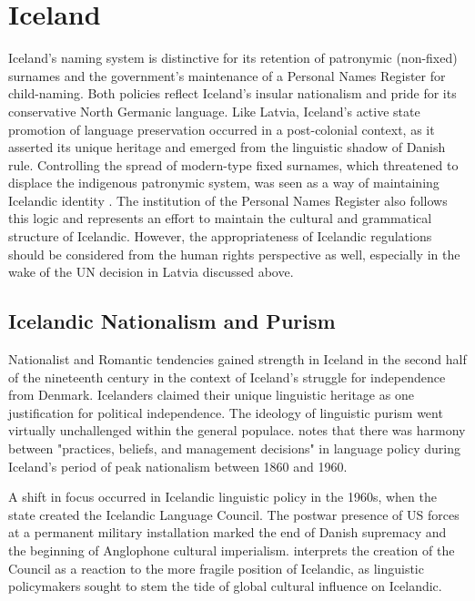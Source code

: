 \section{Iceland}

Iceland's naming system is distinctive for its retention of patronymic (non-fixed) surnames and the government's maintenance of a Personal Names Register for child-naming. Both policies reflect Iceland's insular nationalism and pride for its conservative North Germanic language. Like Latvia, Iceland's active state promotion of language preservation occurred in a post-colonial context, as it asserted its unique heritage and emerged from the linguistic shadow of Danish rule. Controlling the spread of modern-type fixed surnames, which threatened to displace the indigenous patronymic system, was seen as a way of maintaining Icelandic identity \parencite{willson02}. The institution of the Personal Names Register also follows this logic and represents an effort to maintain the cultural and grammatical structure of Icelandic. However, the appropriateness of Icelandic regulations should be considered from the human rights perspective as well, especially in the wake of the UN decision in Latvia discussed above.

\subsection{Icelandic Nationalism and Purism}

Nationalist and Romantic tendencies gained strength in Iceland in the second half of the nineteenth century in the context of Iceland's struggle for independence from Denmark. Icelanders claimed their unique linguistic heritage as one justification for political independence. The ideology of linguistic purism went virtually unchallenged within the general populace. \textcite{kristinsson12} notes that there was harmony between "practices, beliefs, and management decisions" in language policy during Iceland's period of peak nationalism between 1860 and 1960.

A shift in focus occurred in Icelandic linguistic policy in the 1960s, when the state created the Icelandic Language Council. The postwar presence of US forces at a permanent military installation marked the end of Danish supremacy and the beginning of Anglophone cultural imperialism. \textcite{kristinsson12} interprets the creation of the Council as a reaction to the more fragile position of Icelandic, as linguistic policymakers sought to stem the tide of global cultural influence on Icelandic.

